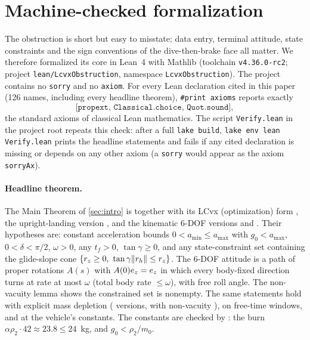\section{Machine-checked formalization}\label{sec:lean}
The obstruction is short but easy to misstate: data entry, terminal attitude, state constraints and the sign conventions of
the dive-then-brake face all matter. We therefore formalized its core in Lean~4 with Mathlib \cite{demoura2021lean4,mathlib2020}
(toolchain \texttt{v4.36.0-rc2}; project \texttt{lean/LcvxObstruction}, namespace \texttt{LcvxObstruction}). The project contains
no \texttt{sorry} and no \texttt{axiom}. For every Lean declaration cited in this paper (126 names, including every headline theorem), \texttt{\#print axioms} reports exactly
\[
\texttt{[propext, Classical.choice, Quot.sound]},
\]
the standard axioms of classical Lean mathematics. The script \texttt{Verify.lean} in the project root repeats this check: after
a full \texttt{lake build}, \texttt{lake env lean Verify.lean} prints the headline statements and fails if any cited declaration is
missing or depends on any other axiom (a \texttt{sorry} would appear as the axiom \texttt{sorryAx}).

\paragraph{Headline theorem.} The Main Theorem of \cref{sec:intro} is  together
with its LCvx (optimization) form , the upright-landing version
, and the kinematic 6-DOF versions
 and . Their hypotheses
are: constant acceleration bounds $0<a_{\min}\le a_{\max}$ with $g_0<a_{\max}$, $0<\delta<\pi/2$, $\omega>0$, any $t_f>0$, $\tan\gamma\ge0$,
and any state-constraint set containing the glide-slope cone $\{r_z\ge0,\ \tan\gamma\lVert r_h\rVert\le r_z\}$. The 6-DOF attitude is a path of
proper rotations $A(s)$ with $A(0)e_z=e_z$ in which every body-fixed direction turns at rate at most $\omega$ (total body rate
$\le\omega$), with free roll angle. The non-vacuity lemma  shows the constrained set is nonempty. The same statements hold with
explicit mass depletion ( versions, with non-vacuity ), on free-time
windows, and at the vehicle's constants. The constants are checked by : the burn $\alpha\rho_2\cdot42\approx23.8\le24$~kg, and
$g_0<\rho_2/m_0$.

